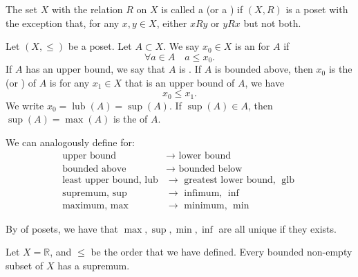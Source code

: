\documentclass[notoc,notitlepage]{tufte-book}
\DeclareMathOperator{\lub}{lub }
\DeclareMathOperator{\glb}{glb }
\begin{document}
\begin{defn}
\label{defn:totally_ordered_sets_chains}
  The set $X$ with the relation $R$ on $X$ is called a  (or a ) if $(X, R)$ is a poset with the exception that, for any $x, y \in X$, either $xRy$ or $yRx$ but not both.
\end{defn}

\begin{defn}[Bounds]
\label{defn:bounds}
  Let $(X, \leq)$ be a poset. Let $A \subset X$. We say $x_0 \in X$ is an  for $A$ if
  \begin{equation*}
    \forall a \in A \quad a \leq x_0.
  \end{equation*}
  If $A$ has an upper bound, we say that $A$ is . If $A$ is bounded above, then $x_0$ is the  (or ) of $A$ is for any $x_1 \in X$ that is an upper bound of $A$, we have
  \begin{equation*}
    x_0 \leq x_1.
  \end{equation*}
  We write $x_0 = \lub (A) = \sup (A)$. If $\sup (A) \in A$, then $\sup (A) = \max (A)$ is the  of $A$.

  We can analogously define for:
  \begin{align*}
    \text{upper bound } &\to \text{ lower bound } \\
    \text{bounded above } &\to \text{ bounded below } \\
    \text{least upper bound, } \lub &\to \text{ greatest lower bound, } \glb \\
    \text{supremum, } \sup &\to \text{ infimum, } \inf \\
    \text{maximum, } \max &\to \text{ minimum, } \min
  \end{align*}
\end{defn}

\begin{note}
  By  of posets, we have that $\max, \sup, \min, \inf$ are all unique if they exists.
\end{note}

\begin{eg}
  Let $X = \mathbb{R}$, and $\leq$ be the order that we have defined. Every bounded non-empty subset of $X$ has a supremum.
\end{eg}
\end{document}
